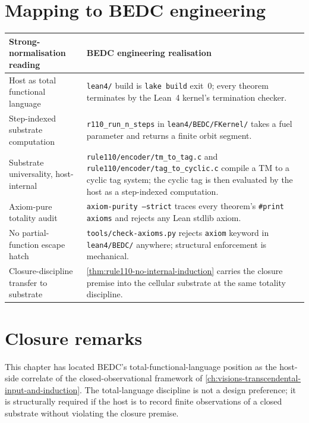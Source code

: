 \section{Mapping to BEDC engineering}
\label{sec:strong-normalization-mapping-engineering}

\begin{longtable}{p{}p{}}
\toprule
\textbf{Strong-normalisation reading} & \textbf{BEDC engineering realisation} \\
\midrule
Host as total functional language &
\texttt{lean4/} build is \texttt{lake build} exit~0; every theorem terminates by the Lean~4 kernel's termination checker. \\
\midrule
Step-indexed substrate computation &
\texttt{r110\_run\_n\_steps} in \texttt{lean4/BEDC/FKernel/} takes a fuel parameter and returns a finite orbit segment. \\
\midrule
Substrate universality, host-internal &
\texttt{rule110/encoder/tm\_to\_tag.c} and \texttt{rule110/encoder/tag\_to\_cyclic.c} compile a TM to a cyclic tag system; the cyclic tag is then evaluated by the host as a step-indexed computation. \\
\midrule
Axiom-pure totality audit &
\texttt{axiom-purity --strict} traces every theorem's \texttt{\#print axioms} and rejects any Lean stdlib axiom. \\
\midrule
No partial-function escape hatch &
\texttt{tools/check-axioms.py} rejects \texttt{axiom} keyword in \texttt{lean4/BEDC/} anywhere; structural enforcement is mechanical. \\
\midrule
Closure-discipline transfer to substrate &
\autoref{thm:rule110-no-internal-induction} carries the closure premise into the cellular substrate at the same totality discipline. \\
\bottomrule
\end{longtable}

\section{Closure remarks}
\label{sec:strong-normalization-closure}

This chapter has located BEDC's total-functional-language position as the host-side correlate of the closed-observational framework of \autoref{ch:visions-transcendental-input-and-induction}. The total-language discipline is not a design preference; it is structurally required if the host is to record finite observations of a closed substrate without violating the closure premise.


